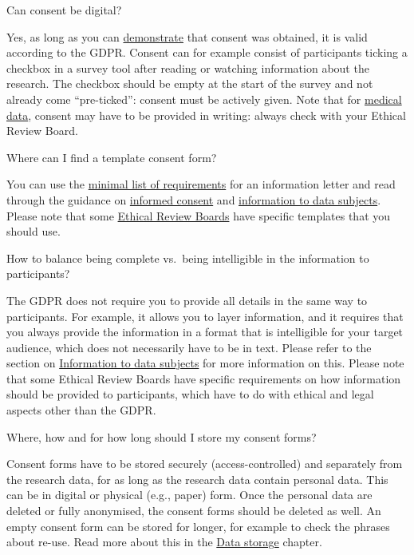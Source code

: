\documentclass[
]{book}
\begin{document}
Can consent be digital?

Yes, as long as you can \protect\hyperlink{forms-consent}{demonstrate} that consent was obtained, it is valid according to the GDPR. Consent can for example consist of participants ticking a checkbox in a survey tool after reading or watching information about the research. The checkbox should be empty at the start of the survey and not already come ``pre-ticked'': consent must be actively given. Note that for \href{https://www.ccmo.nl/onderzoekers/wet-en-regelgeving-voor-medisch-wetenschappelijk-onderzoek/de-wmo-in-een-notendop/toestemming/elektronische-toestemming}{medical data}, consent may have to be provided in writing: always check with your Ethical Review Board.

Where can I find a template consent form?~~~

You can use the \href{https://www.uu.nl/sites/default/files/RDM_Support_Template_Information_letter.pdf}{minimal list of requirements} for an information letter and read through the guidance on \protect\hyperlink{informed-consent-forms}{informed consent} and \protect\hyperlink{privacy-notices}{information to data subjects}. Please note that some \href{https://intranet.uu.nl/en/knowledgebase/ethics-assessment}{Ethical Review Boards} have specific templates that you should use.

How to balance being complete vs.~being intelligible in the information to participants?

The GDPR does not require you to provide all details in the same way to participants. For example, it allows you to layer information, and it requires that you always provide the information in a format that is intelligible for your target audience, which does not necessarily have to be in text. Please refer to the section on \protect\hyperlink{privacy-notices}{Information to data subjects} for more information on this. Please note that some Ethical Review Boards have specific requirements on how information should be provided to participants, which have to do with ethical and legal aspects other than the GDPR.

Where, how and for how long should I store my consent forms?

Consent forms have to be stored securely (access-controlled) and separately from the research data, for as long as the research data contain personal data. This can be in digital or physical (e.g., paper) form. Once the personal data are deleted or fully anonymised, the consent forms should be deleted as well. An empty consent form can be stored for longer, for example to check the phrases about re-use. Read more about this in the \protect\hyperlink{data-storage}{Data storage} chapter.
\end{document}
